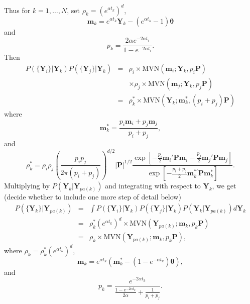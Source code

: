 \documentclass[12pt]{article}
\begin{document}
Thus for $k = 1, \dots , N$, set $\rho_k = (e^{\alpha t_k})^d$,
\begin{equation}
\textbf{m}_k = e^{\alpha t_k} \textbf{Y}_k - (e^{\alpha t_k} - 1) \boldsymbol \theta 
\end{equation}
and 
\begin{equation}
p_k = \frac{2 \alpha e^{-2 \alpha t_i}}{1-e^{-2 \alpha t_i}} .  
\end{equation}
Then
\begin{eqnarray}
P(\{\textbf{Y}_i \} | \textbf{Y}_k) P(\{\textbf{Y}_j \} | \textbf{Y}_k) & = & \rho_i \times \mbox{MVN} (\textbf{m}_i;\textbf{Y}_k,p_i \textbf{P}) \\
& & \times  \rho_j \times \mbox{MVN}(\textbf{m}_j;\textbf{Y}_k,p_j \textbf{P}) \\
& = & \rho^*_k \times \mbox{MVN}(\textbf{Y}_k; \textbf{m}^*_k, (p_i + p_j) \textbf{P})
\end{eqnarray}
where 
\begin{equation}
\textbf{m}^*_k = \frac{p_i \textbf{m}_i + p_j \textbf{m}_j}{p_i + p_j} ,
\end{equation}
and
\begin{equation}
\rho^*_k =  \rho_i \rho_j \left( \frac{p_i p_j}{2 \pi (p_i + p_j)} \right)^{d/2}  |\textbf{P}|^{1/2} \frac {\exp \left[ -\frac{p_i}{2} \textbf{m}_i' \textbf{P} \textbf{m}_i -\frac{p_j}{2}\textbf{m}_j' \textbf{P} \textbf{m}_j  \right] }
{ \exp \left[ -\frac{p_i + p_j}{2} \textbf{m}^{*'}_{k} \textbf{P} \textbf{m}^*_k \right] } .
\end{equation}
Multiplying by $P(\textbf{Y}_k | \textbf{Y}_{pa(k)})$ and integrating with respect to $\textbf{Y}_k$, we get (decide whether to include one more step of detail below)
\begin{eqnarray}
P( \{\textbf{Y}_k \} | \textbf{Y}_{pa(k)} ) & = & \int P(\{\textbf{Y}_i \} | \textbf{Y}_k) P(\{\textbf{Y}_j \} | \textbf{Y}_k) P(\textbf{Y}_k | \textbf{Y}_{pa(k)}) d \textbf{Y}_k \\
& = &  \rho^*_k ( e^{\alpha t_k} )^d \times \mbox{MVN}(\textbf{Y}_{pa(k)}; \textbf{m}_k, p_k \textbf{P}) \\
& = & \rho_k \times \mbox{MVN}(\textbf{Y}_{pa(k)}; \textbf{m}_k, p_k \textbf{P}),
\end{eqnarray}
where $\rho_k = \rho^*_k ( e^{\alpha t_k} )^d $,
\begin{equation}
\textbf{m}_k = e^{\alpha t_k} ( \textbf{m}^*_k - (1 - e^{- \alpha t_k}) \boldsymbol \theta ), 
\end{equation}
and 
\begin{equation}
p_k = \frac{e^{-2 \alpha t_k}}{  \frac{1-e^{-2 \alpha t_k}}{2 \alpha}  + \frac{1}{p_i + p_j} } .
\end{equation}
\end{document}
